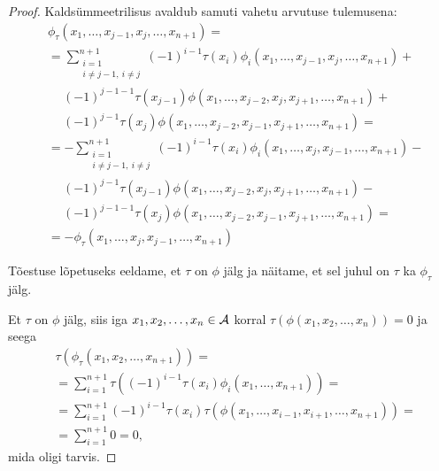 \begin{proof}
    Kaldsümmeetrilisus avaldub samuti vahetu arvutuse tulemusena:
    \begin{align*}
        &\phi_\tau(
          x_1, \dots, x_{j-1}, x_j, \dots, x_{n+1}
        ) = \\
        &= \sum_{\substack{i=1\\i \ne j-1,\ i \ne j}}^{n+1}
          (-1)^{i-1} \tau(x_i) \phi_i(
              x_1, \dots, x_{j-1}, x_j, \dots, x_{n+1}
          ) + \\
        &\quad\ (-1)^{j-1-1} \tau(x_{j-1}) \phi(
              x_1, \dots, x_{j-2}, x_j, x_{j+1}, \dots, x_{n+1}
          ) + \\
        &\quad\ (-1)^{j-1} \tau(x_j) \phi(
              x_1, \dots, x_{j-2}, x_{j-1}, x_{j+1}, \dots, x_{n+1}
          ) = \\
        &= -\sum_{\substack{i=1\\i \ne j-1,\ i \ne j}}^{n+1}
          (-1)^{i-1} \tau(x_i) \phi_i(
              x_1, \dots, x_j, x_{j-1}, \dots, x_{n+1}
          ) - \\
        &\quad\ (-1)^{j-1} \tau(x_{j-1}) \phi(
              x_1, \dots, x_{j-2}, x_j, x_{j+1}, \dots, x_{n+1}
          ) - \\
        &\quad\ (-1)^{j-1-1} \tau(x_j) \phi(
              x_1, \dots, x_{j-2}, x_{j-1}, x_{j+1}, \dots, x_{n+1}
          ) = \\
        &= - \phi_\tau(
              x_1, \dots, x_j, x_{j-1}, \dots, x_{n+1}
            )
    \end{align*}

    Tõestuse lõpetuseks eeldame, et $\tau$ on $\phi$ jälg ja
    näitame, et sel juhul on $\tau$ ka $\phi_\tau$ jälg.

    Et $\tau$ on $\phi$ jälg, siis iga $x_1, x_2, \dots, x_n \in \mathcal{A}$
    korral $\tau(\phi(x_1, x_2, \dots, x_n)) = 0$ ja seega
    \begin{align*}
        &\tau(\phi_\tau(x_1, x_2, \dots, x_{n+1})) = \\
        &= \sum_{i=1}^{n+1} \tau \left(
            (-1)^{i-1} \tau(x_i) \phi_i(x_1, \dots, x_{n+1})
        \right) = \\
        &= \sum_{i=1}^{n+1} (-1)^{i-1} \tau(x_i) \tau \left(
            \phi(x_1, \dots, x_{i-1}, x_{i+1}, \dots, x_{n+1})
        \right) = \\
        &= \sum_{i=1}^{n+1} 0 = 0,
    \end{align*}
    mida oligi tarvis.
\end{proof}

